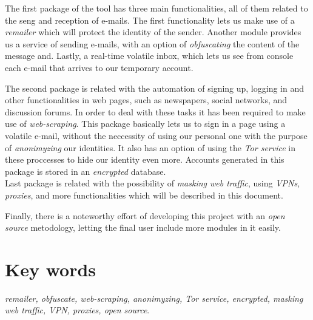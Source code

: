 The first package of the tool has three main functionalities, all of
them related to the seng and reception of e-mails. The first
functionality lets us make use of a \textit{remailer} which will
protect the identity of the sender. Another module provides us a
service of sending e-mails, with an option of \textit{obfuscating} the
content of the message and. Lastly, a real-time volatile inbox, which
lets us see from console each e-mail that arrives to our temporary
account.

The second package is related with the automation of signing up, logging in and other functionalities in web pages, such as newspapers, social networks, and discussion forums. In order to deal with these tasks it has been required to make use of \textit{web-scraping}. This package basically lets us to sign in a page using a volatile e-mail, without the neccessity of using our personal one with the purpose of \textit{anonimyzing} our identities. It also has an option of using the \textit{Tor service} in these proccesses to hide our identity even more. Accounts generated in this package is stored in an \textit{encrypted} database. \\
Last package is related with the possibility of \textit{masking web
  traffic}, using \textit{VPNs}, \textit{proxies}, and more
functionalities which will be described in this document.

Finally, there is a noteworthy effort of developing this project with
an \textit{open source} metodology, letting the final user include
more modules in it easily.

\section*{Key words}
\textit{remailer, obfuscate, web-scraping, anonimyzing, Tor service, encrypted, masking web traffic, VPN, proxies, open source}.

